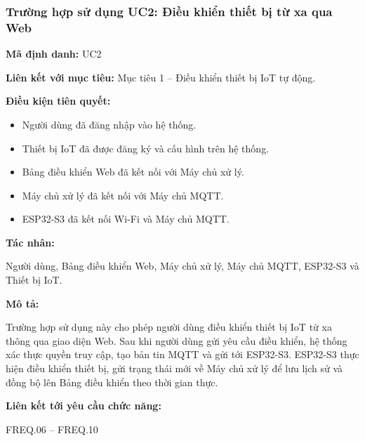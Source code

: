 \documentclass[a4paper,12pt]{article}
\begin{document}
\subsubsection{Trường hợp sử dụng UC2: Điều khiển thiết bị từ xa qua Web}

\textbf{Mã định danh:}
UC2

\textbf{Liên kết với mục tiêu:}
Mục tiêu 1 -- Điều khiển thiết bị IoT tự động.

\textbf{Điều kiện tiên quyết:}
\begin{itemize}
    \item Người dùng đã đăng nhập vào hệ thống.
    \item Thiết bị IoT đã được đăng ký và cấu hình trên hệ thống.
    \item Bảng điều khiển Web đã kết nối với Máy chủ xử lý.
    \item Máy chủ xử lý đã kết nối với Máy chủ MQTT.
    \item ESP32-S3 đã kết nối Wi-Fi và Máy chủ MQTT.
\end{itemize}

\textbf{Tác nhân:}

Người dùng, Bảng điều khiển Web, Máy chủ xử lý, Máy chủ MQTT, ESP32-S3 và Thiết bị IoT.

\textbf{Mô tả:}

Trường hợp sử dụng này cho phép người dùng điều khiển thiết bị IoT từ xa thông qua giao diện Web. Sau khi người dùng gửi yêu cầu điều khiển, hệ thống xác thực quyền truy cập, tạo bản tin MQTT và gửi tới ESP32-S3. ESP32-S3 thực hiện điều khiển thiết bị, gửi trạng thái mới về Máy chủ xử lý để lưu lịch sử và đồng bộ lên Bảng điều khiển theo thời gian thực.

\textbf{Liên kết tới yêu cầu chức năng:}

FREQ.06 -- FREQ.10
\\
\end{document}
